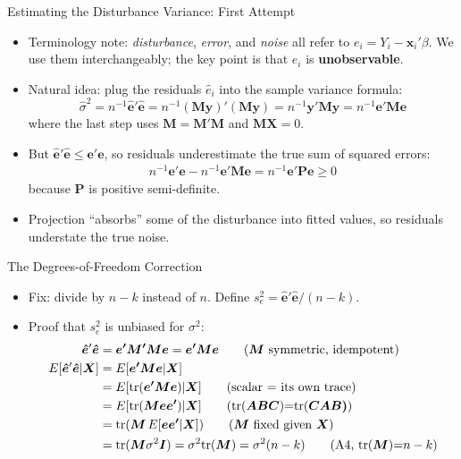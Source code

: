 \documentclass[aspectratio=169, handout]{beamer}
\numberwithin{equation}{section}
\begin{document}
\begin{frame}{Estimating the Disturbance Variance: First Attempt}
\small
\begin{itemize}
\item Terminology note: \emph{disturbance}, \emph{error}, and \emph{noise} all refer to $e_i = Y_i - \bm{x}_i'\beta$. We use them interchangeably; the key point is that $e_i$ is \textbf{unobservable}.\pause
\item Natural idea: plug the residuals $\hat{e}_i$ into the sample variance formula:
$$\hat{\sigma}^2=n^{-1}\bm{\hat{e}'\hat{e}}=n^{-1}(\bm{My})'(\bm{My})=n^{-1}\bm{y'My}=n^{-1}\bm{e'Me}$$
where the last step uses $\bm{M}=\bm{M'M}$ and $\bm{MX}=0$.\pause
\item But $\bm{\hat{e}'\hat{e}} \leq \bm{e'e}$, so residuals underestimate the true sum of squared errors:
\begin{align*}
n^{-1}\bm{e'e}-n^{-1}\bm{e'Me}=n^{-1}\bm{e'Pe}\geq 0
\end{align*}
because $\bm{P}$ is positive semi-definite.
\item Projection ``absorbs'' some of the disturbance into fitted values, so residuals understate the true noise.
\end{itemize}
\end{frame}


\begin{frame}{The Degrees-of-Freedom Correction}
\small
\begin{itemize}
\item Fix: divide by $n-k$ instead of $n$. Define $s^2_e=\bm{\hat{e}}'\bm{\hat{e}}/(n-k)$.
\item Proof that $s^2_e$ is unbiased for $\sigma^2$:
\begin{align*}
\bm{\hat{e}}'\bm{\hat{e}}&=\bm{e'M'Me}=\bm{e'Me} \tag{$\bm{M}$ symmetric, idempotent}\\
E[\bm{\hat{e}}'\bm{\hat{e}}|\bm{X}]&=E[\bm{e'Me}|\bm{X}]\\
&=E[\text{tr}(\bm{e'Me})|\bm{X}] \tag{scalar $=$ its own trace}\\
&=E[\text{tr}(\bm{Mee'})|\bm{X}] \tag{tr($\bm{ABC}$)=tr($\bm{CAB)}$}\\
&=\text{tr}(\bm{M}\, E[\bm{ee'}|\bm{X}]) \tag{$\bm{M}$ fixed given $\bm{X}$}\\
&=\text{tr}(\bm{M}\sigma^2\bm{I})=\sigma^2\text{tr}(\bm{M})=\sigma^2 (n-k) \tag{A4, tr($\bm{M}$)=$n-k$}
\end{align*}
\end{itemize}
\end{frame}
\end{document}
